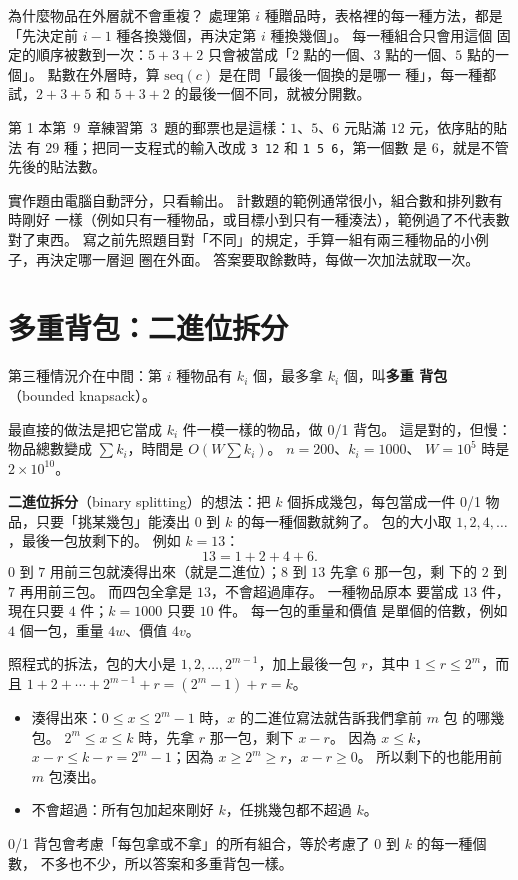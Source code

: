 為什麼物品在外層就不會重複？ 處理第 $i$ 種贈品時，表格裡的每一種方法，都是
「先決定前 $i - 1$ 種各換幾個，再決定第 $i$ 種換幾個」。 每一種組合只會用這個
固定的順序被數到一次：$5 + 3 + 2$ 只會被當成「$2$ 點的一個、$3$ 點的一個、$5$
點的一個」。 點數在外層時，算 $\mathrm{seq}(c)$ 是在問「最後一個換的是哪一
種」，每一種都試，$2 + 3 + 5$ 和 $5 + 3 + 2$ 的最後一個不同，就被分開數。

第 1 本第~9~章練習第~3~題的郵票也是這樣：$1$、$5$、$6$ 元貼滿 $12$ 元，依序貼的貼法
有 $29$ 種；把同一支程式的輸入改成 \texttt{3 12} 和 \texttt{1 5 6}，第一個數
是 $6$，就是不管先後的貼法數。

\begin{apcsnote}
實作題由電腦自動評分，只看輸出。 計數題的範例通常很小，組合數和排列數有時剛好
一樣（例如只有一種物品，或目標小到只有一種湊法），範例過了不代表數對了東西。
寫之前先照題目對「不同」的規定，手算一組有兩三種物品的小例子，再決定哪一層迴
圈在外面。 答案要取餘數時，每做一次加法就取一次。
\end{apcsnote}

\section{多重背包：二進位拆分}
\label{sec:knap-bounded}

第三種情況介在中間：第 $i$ 種物品有 $k_i$ 個，最多拿 $k_i$ 個，叫\textbf{多重
背包}（bounded knapsack）。

最直接的做法是把它當成 $k_i$ 件一模一樣的物品，做 0/1 背包。 這是對的，但慢：
物品總數變成 $\sum k_i$，時間是 $O(W \sum k_i)$。 $n = 200$、$k_i = 1000$、
$W = 10^5$ 時是 $2 \times 10^{10}$。

\textbf{二進位拆分}（binary splitting）的想法：把 $k$ 個拆成幾包，每包當成一件
0/1 物品，只要「挑某幾包」能湊出 $0$ 到 $k$ 的每一種個數就夠了。 包的大小取
$1, 2, 4, \ldots$，最後一包放剩下的。 例如 $k = 13$：
\[
13 = 1 + 2 + 4 + 6.
\]
$0$ 到 $7$ 用前三包就湊得出來（就是二進位）；$8$ 到 $13$ 先拿 $6$ 那一包，剩
下的 $2$ 到 $7$ 再用前三包。 而四包全拿是 $13$，不會超過庫存。 一種物品原本
要當成 $13$ 件，現在只要 $4$ 件；$k = 1000$ 只要 $10$ 件。 每一包的重量和價值
是單個的倍數，例如 $4$ 個一包，重量 $4w$、價值 $4v$。

\begin{whybox}[拆出來的包剛好湊得出 $0$ 到 $k$]
照程式的拆法，包的大小是 $1, 2, \ldots, 2^{m-1}$，加上最後一包 $r$，其中
$1 \le r \le 2^m$，而且 $1 + 2 + \cdots + 2^{m-1} + r = (2^m - 1) + r = k$。

\begin{itemize}
\item 湊得出來：$0 \le x \le 2^m - 1$ 時，$x$ 的二進位寫法就告訴我們拿前 $m$ 包
的哪幾包。 $2^m \le x \le k$ 時，先拿 $r$ 那一包，剩下 $x - r$。 因為
$x \le k$，$x - r \le k - r = 2^m - 1$；因為 $x \ge 2^m \ge r$，$x - r \ge 0$。
所以剩下的也能用前 $m$ 包湊出。
\item 不會超過：所有包加起來剛好 $k$，任挑幾包都不超過 $k$。
\end{itemize}

0/1 背包會考慮「每包拿或不拿」的所有組合，等於考慮了 $0$ 到 $k$ 的每一種個數，
不多也不少，所以答案和多重背包一樣。
\end{whybox}

